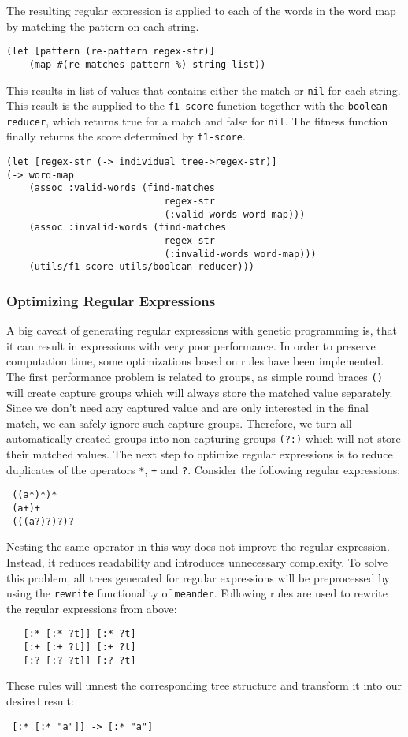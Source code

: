 \documentclass[runningheads]{llncs}
\begin{document}
The resulting regular expression is applied to each of the words in the word map by matching the pattern on each string.
\begin{lstlisting}
(let [pattern (re-pattern regex-str)]
    (map #(re-matches pattern %) string-list))
\end{lstlisting}
This results in list of values that contains either the match or \texttt{nil} for each string. This result is the supplied to the \texttt{f1-score} function together with the \texttt{boolean-reducer}, which returns true for a match and false for \texttt{nil}. The fitness function finally returns the score determined by \texttt{f1-score}.
\begin{lstlisting}
(let [regex-str (-> individual tree->regex-str)]
(-> word-map
    (assoc :valid-words (find-matches
                            regex-str
                            (:valid-words word-map)))
    (assoc :invalid-words (find-matches
                            regex-str
                            (:invalid-words word-map)))
    (utils/f1-score utils/boolean-reducer)))
\end{lstlisting}

\subsubsection{Optimizing Regular Expressions}
A big caveat of generating regular expressions with genetic programming is, that it can result in expressions with very poor performance. In order to preserve computation time, some optimizations based on rules have been implemented. The first performance problem is related to groups, as simple round braces \texttt{()} will create capture groups which will always store the matched value separately. Since we don't need any captured value and are only interested in the final match, we can safely ignore such capture groups. Therefore, we turn all automatically created groups into non-capturing groups \texttt{(?:)} which will not store their matched values.
The next step to optimize regular expressions is to reduce duplicates of the operators \texttt{*}, \texttt{+} and \texttt{?}. Consider the following regular expressions:
\begin{verbatim}
 ((a*)*)*
 (a+)+
 (((a?)?)?)?
\end{verbatim}
Nesting the same operator in this way does not improve the regular expression. Instead, it reduces readability and introduces unnecessary complexity.
To solve this problem, all trees generated for regular expressions will be preprocessed by using the \texttt{rewrite} functionality of \texttt{meander}.
Following rules are used to rewrite the regular expressions from above:
\begin{verbatim}
   [:* [:* ?t]] [:* ?t]
   [:+ [:+ ?t]] [:+ ?t]
   [:? [:? ?t]] [:? ?t]
\end{verbatim}
These rules will unnest the corresponding tree structure and transform it into our desired result:
\begin{verbatim}
 [:* [:* "a"]] -> [:* "a"]
\end{verbatim}
\end{document}
